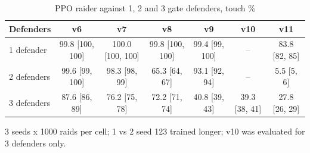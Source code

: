 \begin{table}[t]
\centering
\caption{PPO raider against 1, 2 and 3 gate defenders, touch \%}
\label{tab:T2_defender_count}
\begin{tabular}{lcccccc}
\toprule
Defenders & v6 & v7 & v8 & v9 & v10 & v11 \\
\midrule
1 defender & 99.8 [100, 100] & 100.0 [100, 100] & 99.8 [100, 100] & 99.4 [99, 100] & -- & 83.8 [82, 85] \\
2 defenders & 99.6 [99, 100] & 98.3 [98, 99] & 65.3 [64, 67] & 93.1 [92, 94] & -- & 5.5 [5, 6] \\
3 defenders & 87.6 [86, 89] & 76.2 [75, 78] & 72.2 [71, 74] & 40.8 [39, 43] & 39.3 [38, 41] & 27.8 [26, 29] \\
\bottomrule
\end{tabular}
\par\smallskip\footnotesize 3 seeds x 1000 raids per cell; 1 vs 2 seed 123 trained longer; v10 was evaluated for 3 defenders only.
\end{table}
